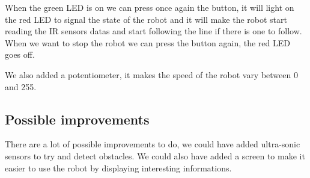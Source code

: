 When the green LED is on we can press once again the button, it will light on the red LED to signal the state of the robot and it will make the robot start reading the IR sensors datas and start following the line if there is one to follow.
When we want to stop the robot we can press the button again, the red LED goes off.

We also added a potentiometer, it makes the speed of the robot vary between 0 and 255.

\subsection*{Possible improvements}

There are a lot of possible improvements to do, we could have added ultra-sonic sensors to try and detect obstacles.
We could also have added a screen to make it easier to use the robot by displaying interesting informations.
